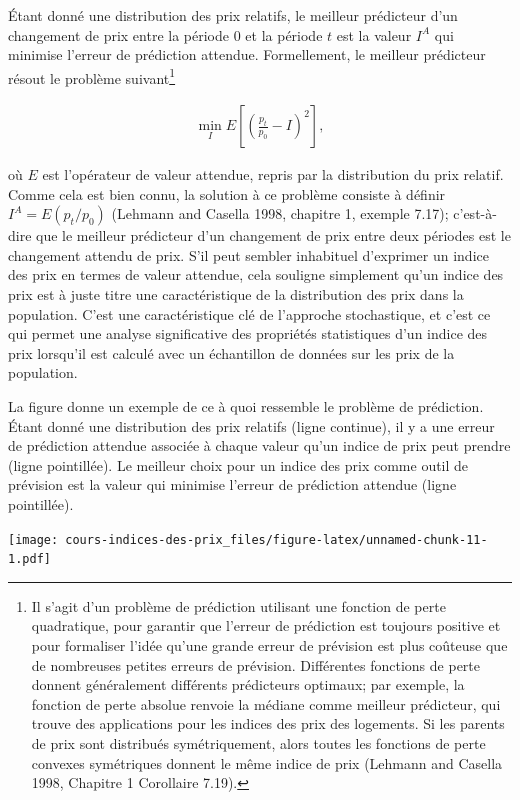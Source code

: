 \documentclass[
]{article}
\begin{document}
Étant donné une distribution des prix relatifs, le meilleur prédicteur d'un changement de prix entre la période 0 et la période \(t\) est la valeur \(I^{A}\) qui minimise l'erreur de prédiction attendue. Formellement, le meilleur prédicteur résout le problème suivant\footnote{Il s'agit d'un problème de prédiction utilisant une fonction de perte quadratique, pour garantir que l'erreur de prédiction est toujours positive et pour formaliser l'idée qu'une grande erreur de prévision est plus coûteuse que de nombreuses petites erreurs de prévision. Différentes fonctions de perte donnent généralement différents prédicteurs optimaux; par exemple, la fonction de perte absolue renvoie la médiane comme meilleur prédicteur, qui trouve des applications pour les indices des prix des logements. Si les parents de prix sont distribués symétriquement, alors toutes les fonctions de perte convexes symétriques donnent le même indice de prix (Lehmann and Casella 1998, Chapitre 1 Corollaire 7.19).}

\begin{align*}
\min_{I} E\left[\left(\frac{p_{t}}{p_{0}} - I \right)^{2} \right],
\end{align*}

où \(E\) est l'opérateur de valeur attendue, repris par la distribution du prix relatif. Comme cela est bien connu, la solution à ce problème consiste à définir \(I^{A} = E(p_{t} / p_{0})\) (Lehmann and Casella 1998, chapitre 1, exemple 7.17); c'est-à-dire que le meilleur prédicteur d'un changement de prix entre deux périodes est le changement attendu de prix. S'il peut sembler inhabituel d'exprimer un indice des prix en termes de valeur attendue, cela souligne simplement qu'un indice des prix est à juste titre une caractéristique de la distribution des prix dans la population. C'est une caractéristique clé de l'approche stochastique, et c'est ce qui permet une analyse significative des propriétés statistiques d'un indice des prix lorsqu'il est calculé avec un échantillon de données sur les prix de la population.

La figure donne un exemple de ce à quoi ressemble le problème de prédiction. Étant donné une distribution des prix relatifs (ligne continue), il y a une erreur de prédiction attendue associée à chaque valeur qu'un indice de prix peut prendre (ligne pointillée). Le meilleur choix pour un indice des prix comme outil de prévision est la valeur qui minimise l'erreur de prédiction attendue (ligne pointillée).

\texttt{[image: cours-indices-des-prix\_files/figure-latex/unnamed-chunk-11-1.pdf]}
\end{document}

